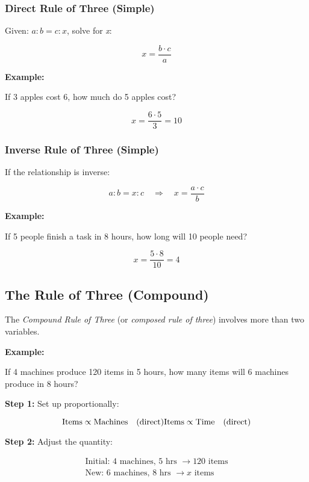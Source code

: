 \subsubsection{Direct Rule of Three (Simple)}

Given: \(a : b = c : x\), solve for \emph{x}:

\[
    x = \frac{b \cdot c}{a}
\]

\textbf{Example:}
\vspace{\baselineskip}
 
If 3 apples cost 6, how much do 5 apples cost?

\[
    x = \frac{6 \cdot 5}{3} = 10
\]

\subsubsection{Inverse Rule of Three (Simple)}

If the relationship is inverse:

\[
    a : b = x : c \quad \Rightarrow \quad x = \frac{a \cdot c}{b}
\]

\textbf{Example:}
\vspace{\baselineskip}
 
If 5 people finish a task in 8 hours, how long will 10 people need?

\[
    x = \frac{5 \cdot 8}{10} = 4
\]

\subsection{The Rule of Three (Compound)}

The \emph{Compound Rule of Three} (or \emph{composed rule of three}) involves more than two variables.
\vspace{\baselineskip}

\textbf{Example:}
\vspace{\baselineskip}
 
If 4 machines produce 120 items in 5 hours, how many items will 6 machines produce in 8 hours?
\vspace{\baselineskip}

\textbf{Step 1:} Set up proportionally:

\[
    \text{Items} \propto \text{Machines} \quad (\text{direct}) \\
    \text{Items} \propto \text{Time} \quad (\text{direct})
\]

\textbf{Step 2:} Adjust the quantity:

\begin{align*}
    \text{Initial: } 4 \text{ machines, } 5 \text{ hrs } \rightarrow 120 \text{ items} \\
    \text{New: } 6 \text{ machines, } 8 \text{ hrs } \rightarrow x \text{ items}
\end{align*}

